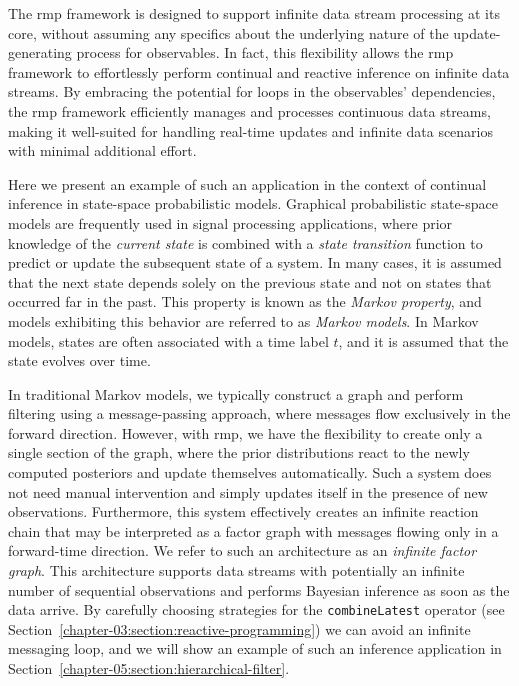 The \ac{rmp} framework is designed to support infinite data stream processing at its core, without
assuming any specifics about the underlying nature of the update-generating process for
observables.
In fact, this flexibility allows the \ac{rmp} framework to effortlessly perform continual and
reactive inference on infinite data streams.
By embracing the potential for loops in the observables' dependencies, the \ac{rmp} framework
efficiently manages and processes continuous data streams, making it well-suited for handling
real-time updates and infinite data scenarios with minimal additional effort.

Here we present an example of such an application in the context of continual inference in
state-space probabilistic models.
Graphical probabilistic state-space models are frequently used in signal processing
applications, where prior knowledge of the \textit{current state} is combined with a
\textit{state transition} function to predict or update the subsequent state of a system.
In many cases, it is assumed that the next state depends solely on the previous state and not
on states that occurred far in the past.
This property is known as the \textit{Markov property}, and models exhibiting this behavior
are referred to as \textit{Markov models}.
In Markov models, states are often associated with a time label $t$, and it is assumed that
the state evolves over time.

In traditional Markov models, we typically construct a graph and perform
filtering using a message-passing approach, where messages flow exclusively in the forward
direction.
However, with \ac{rmp}, we have the flexibility to create only a single
section of the graph, where the prior distributions react to the newly computed posteriors and update themselves automatically. Such a system does not need manual intervention and simply updates itself in the presence of new observations.
Furthermore, this system effectively creates an infinite reaction chain that may be interpreted as a factor graph
with messages flowing only in a forward-time direction.
We refer to such an architecture as an \textit{infinite factor graph}.
This architecture supports data streams with potentially an infinite number of sequential
observations and performs Bayesian inference as soon as the data arrive.
By carefully choosing strategies for the \texttt{combineLatest} operator (see
Section~\ref{chapter-03:section:reactive-programming}) we can avoid an infinite messaging
loop, and we will show an example of such an inference application in
Section~\ref{chapter-05:section:hierarchical-filter}.

